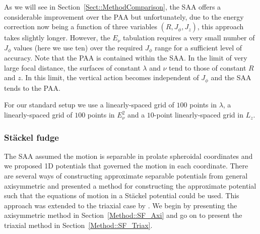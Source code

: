 \documentclass[useAMS,usenatbib,fleqn,a4paper]{mn2e}
\begin{document}
As we will see in Section~\ref{Sect::MethodComparison}, the SAA offers a considerable improvement over the PAA but unfortunately, due to the energy correction now being a function of three variables $(R,J_\phi,J_z)$, this approach takes slightly longer. However, the $E_\nu$ tabulation requires a very small number of $J_\phi$ values (here we use ten) over the required $J_\phi$ range for a sufficient level of accuracy. Note that the PAA is contained within the SAA. In the limit of very large focal distance, the surfaces of constant $\lambda$ and $\nu$ tend to those of constant $R$ and $z$. In this limit, the vertical action becomes independent of $J_\phi$ and the SAA tends to the PAA.

For our standard setup we use a linearly-spaced grid of $100$ points in $\lambda$, a linearly-spaced grid of $100$ points in $E_\nu^2$ and a $10$-point linearly-spaced grid in $L_z$.

\subsubsection{St\"ackel fudge}\label{Method::SF}
The SAA assumed the motion is separable in prolate spheroidal coordinates and we proposed 1D potentials that governed the motion in each coordinate. There are several ways of constructing approximate separable potentials from general axisymmetric and \cite{Binney2012} presented a method for constructing the approximate potential such that the equations of motion in a St\"ackel potential could be used. This approach was extended to the triaxial case by \cite{SandersBinney2015}. We begin by presenting the axisymmetric method in Section~\ref{Method::SF_Axi} and go on to present the triaxial method in Section~\ref{Method::SF_Triax}.
\end{document}
